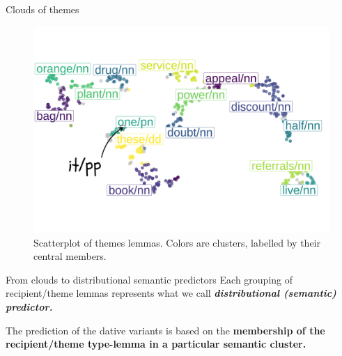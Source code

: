 \documentclass[
  ignorenonframetext,
]{beamer}
\begin{document}
\begin{frame}{Clouds of themes}
\protect\hypertarget{clouds-of-themes}{}
\begin{figure}

{\centering \includegraphics{index_files/figure-beamer/fig-tsne-t-1.pdf}

}

\caption{\label{fig-tsne-t}Scatterplot of themes lemmas. Colors are
clusters, labelled by their central members.}

\end{figure}
\end{frame}

\begin{frame}{From clouds to distributional semantic predictors}
\protect\hypertarget{from-clouds-to-distributional-semantic-predictors}{}
Each grouping of recipient/theme lemmas represents what we call
\textbf{\emph{distributional (semantic) predictor.}}

The prediction of the dative variants is based on the \textbf{membership
of the recipient/theme type-lemma in a particular semantic cluster.}

\end{frame}
\end{document}
